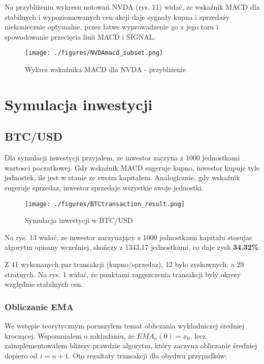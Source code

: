 \documentclass[a4paper,12pt]{article}  %
\begin{document}
Na przybliżeniu wykresu notowań NVDA (rys. 11) widać, ze wskaźnik MACD
dla stabilnych i wypoziomowanych cen akcji daje sygnały kupna i sprzedaży 
niekoniecznie optymalne, przez łatwe wyprowadzenie go z jego toru i spowodowanie
przecięcia linii MACD i SIGNAL.

\begin{figure}[H]
  \centering
  \texttt{[image: ./figures/NVDAmacd\_subset.png]}
  \caption{Wykres wskaźnika MACD dla NVDA - przybliżenie}
\end{figure}

\pagebreak

\section{Symulacja inwestycji}

\subsection{BTC/USD}

Dla symulacji inwestycji przyjalem, ze inwestor zaczyna z 1000 jednostkami
wartosci poczatkowej. Gdy wskaźnik MACD sugeruje kupno, inwestor kupuje
tyle jednostek, ile jest w stanie ze swoim kapitałem. Analogicznie, gdy 
wskaźnik sugeruje sprzedaz, inwestor sprzedaje wszystkie swoje jednostki.

\begin{figure}[H]
  \centering
  \texttt{[image: ./figures/BTCtransaction\_result.png]}
  \caption{Symulacja inwestycji w BTC/USD}
\end{figure}

Na rys. 13 widać, ze inwestor zaczynający z 1000 jednostkami kapitału stosujac
algorytm opisany wcześniej, skończy z 1343.17 jednostkami, co daje zysk
\textbf{34.32\%}.

Z 41 wykonanych par transakcji (kupno/sprzedaz), 12 bylo zyskownych, a 29
stratnych. Na rys. 1 widać, że punktami zagęszczenia transakcji
byly okresy względnie stabilnych cen.

\subsubsection{Obliczanie EMA}
We wstępie teorytycznym poruszylem temat obliczania wykładniczej średniej
kroczącej. Wspomniałem o zakładaniu, że $EMA_{n}(0) = x_0$, lecz
zaimplementowałem bliższy prawdzie algorytm, który zaczyna obliczanie
średniej dopiero od $i = n+1$. Oto rezultaty transakcji dla obydwu przypadków:
\end{document}

